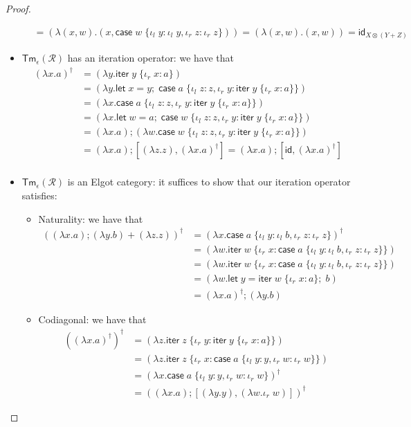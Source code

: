 \documentclass[acmsmall,screen,review]{acmart}
\newcommand{\mc}[1]{\ensuremath{\mathcal{#1}}}
\newcommand{\ms}[1]{\ensuremath{\mathsf{#1}}}
\newcommand{\lto}{:}
\newcommand{\linl}[1]{\iota_l\;{#1}}
\newcommand{\linr}[1]{\iota_r\;{#1}}
\newcommand{\letexpr}[3]{\ensuremath{\ms{let}\;#1 = #2;\;#3}}
\newcommand{\caseexpr}[5]{\ms{case}\;#1\;\{\linl{#2} \lto #3, \linr{#4} \lto #5\}}
\newcommand{\liter}[3]{\ms{iter}\;#1\;\{ \linr{#2} \lto #3 \}}
\begin{document}
\begin{proof}
\begin{itemize}
\begin{align*}
    &= (\lambda (x, w) . (x, \caseexpr{w}{y}{\linl{y}}{z}{\linr{z}}))
    = (\lambda (x, w) . (x, w)) = \ms{id}_{X \otimes (Y + Z)}
  \end{align*}
  \item $\ms{Tm}_\epsilon(\mc{R})$ has an iteration operator: we have that
  \begin{align*}
    (\lambda x . a)^\dagger
    &= (\lambda y . \liter{y}{x}{a}) \\
    &= (\lambda y . \letexpr{x}{y}{\caseexpr{a}{z}{z}{y}{\liter{y}{x}{a}}}) \\
    &= (\lambda x . \caseexpr{a}{z}{z}{y}{\liter{y}{x}{a}}) \\
    &= (\lambda x . \letexpr{w}{a}{\caseexpr{w}{z}{z}{y}{\liter{y}{x}{a}}}) \\
    &= (\lambda x . a) ; (\lambda w . \caseexpr{w}{z}{z}{y}{\liter{y}{x}{a}}) \\
    &= (\lambda x . a) ; [(\lambda z.z), (\lambda x.a)^\dagger]
    = (\lambda x.a) ; [\ms{id}, (\lambda x.a)^\dagger] \\
  \end{align*}
  \item $\ms{Tm}_\epsilon(\mc{R})$ is an Elgot category: it suffices to show that our iteration
  operator satisfies:
  \begin{itemize}
    \item Naturality: we have that
    \begin{align*}
    ((\lambda x.a) ; (\lambda y.b) + (\lambda z.z))^\dagger 
    &= (\lambda x.\caseexpr{a}{y}{\linl{b}}{z}{\linr{z}})^\dagger \\
    &= (\lambda w.\liter{w}{x}{\caseexpr{a}{y}{\linl{b}}{z}{\linr{z}}}) \\
    &= (\lambda w.\liter{w}{x}{\caseexpr{a}{y}{\linl{b}}{z}{\linr{z}}}) \\
    &= (\lambda w.\letexpr{y}{\liter{w}{x}{a}}{b}) \\
    &= (\lambda x.a)^\dagger ; (\lambda y.b)
    \end{align*} 
    \item Codiagonal: we have that
    \begin{align*}
    ((\lambda x.a)^\dagger)^\dagger
    &= (\lambda z.\liter{z}{y}{\liter{y}{x}{a}}) \\
    &= (\lambda z.\liter{z}{x}{\caseexpr{a}{y}{y}{w}{\linr{w}}}) \\
    &= (\lambda x.\caseexpr{a}{y}{y}{w}{\linr{w}})^\dagger \\
    &= ((\lambda x.a) ; [(\lambda y.y), (\lambda w.\linr{w})])^\dagger

\end{align*}
\end{itemize}
\end{itemize}
\end{proof}
\end{document}
